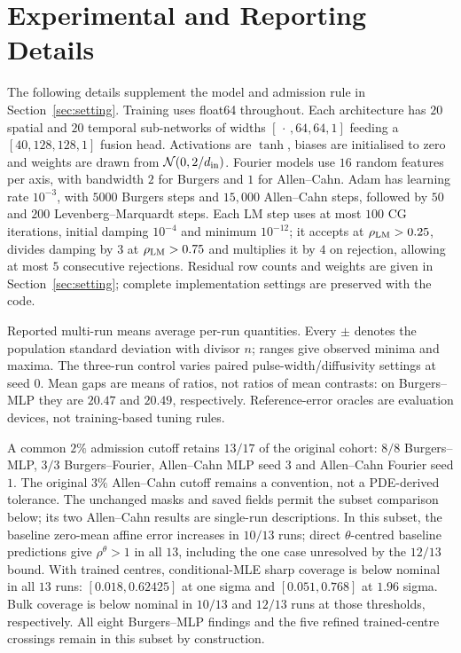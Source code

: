 \section{Experimental and Reporting Details}\label{app:training}\label{app:conventions}

The following details supplement the model and admission rule in Section~\ref{sec:setting}.
Training uses float64 throughout. Each architecture has $20$ spatial and $20$ temporal
sub-networks of widths $[\,\cdot\,,64,64,1]$ feeding a $[40,128,128,1]$ fusion head.
Activations are $\tanh$, biases are initialised to zero and weights are drawn from
$\mathcal N(0,2/d_{\rm in})$. Fourier models use $16$ random features per axis, with
bandwidth $2$ for Burgers and $1$ for Allen--Cahn. Adam has learning rate $10^{-3}$,
with $5000$ Burgers steps and $15{,}000$ Allen--Cahn steps, followed by $50$ and $200$
Levenberg--Marquardt steps. Each LM step uses at most $100$ CG iterations, initial
damping $10^{-4}$ and minimum $10^{-12}$; it accepts at $\rho_{\rm LM}>0.25$, divides
damping by $3$ at $\rho_{\rm LM}>0.75$ and multiplies it by $4$ on rejection, allowing
at most $5$ consecutive rejections. Residual row counts and weights are given in
Section~\ref{sec:setting}; complete implementation settings are preserved with the code.

Reported multi-run means average per-run quantities. Every $\pm$ denotes the population
standard deviation with divisor $n$; ranges give observed minima and maxima.
The three-run control varies paired pulse-width/diffusivity settings at seed $0$.
Mean gaps are means of ratios, not ratios of mean contrasts: on Burgers--MLP they are
$20.47$ and $20.49$, respectively. Reference-error oracles are evaluation devices,
not training-based tuning rules.

A common $2\%$ admission cutoff retains $13/17$ of the original cohort:
$8/8$ Burgers--MLP, $3/3$ Burgers--Fourier, Allen--Cahn MLP seed $3$ and
Allen--Cahn Fourier seed $1$. The original $3\%$ Allen--Cahn cutoff remains a
convention, not a PDE-derived tolerance. The unchanged masks and saved fields
permit the subset comparison below; its two Allen--Cahn results are single-run
descriptions. In this subset, the baseline zero-mean affine error increases in
$10/13$ runs; direct $\theta$-centred baseline predictions give $\rho^\theta>1$ in
all $13$, including the one case unresolved by the $12/13$ bound.
With trained centres, conditional-MLE sharp coverage is below nominal in all $13$ runs:
$[0.018,0.62425]$ at one sigma and $[0.051,0.768]$ at $1.96$ sigma. Bulk
coverage is below nominal in $10/13$ and $12/13$ runs at those thresholds,
respectively. All eight Burgers--MLP findings and the five refined trained-centre
crossings remain in this subset by construction.

